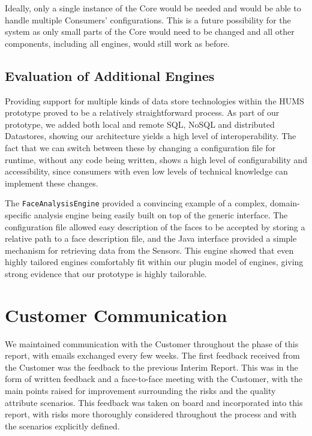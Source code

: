 \documentclass[10pt,a4paper]{article}
\begin{document}
Ideally, only a single instance of the Core would be needed and would be able to handle multiple Consumers' configurations. This is a future possibility for the system as only small parts of the Core would need to be changed and all other components, including all engines, would still work as before.

\subsection{Evaluation of Additional Engines}
\label{sec:additional}

Providing support for multiple kinds of data store technologies within the HUMS prototype proved to be a relatively straightforward process. As part of our prototype, we added both local and remote SQL, NoSQL and distributed Datastores, showing our architecture yields a high level of interoperability. The fact that we can switch between these by changing a configuration file for runtime, without any code being written, shows a high level of configurability and accessibility, since consumers with even low levels of technical knowledge can implement these changes.

The \texttt{FaceAnalysisEngine} provided a convincing example of a complex, domain-specific analysis engine being easily built on top of the generic interface. The configuration file allowed easy description of the faces to be accepted by storing a relative path to a face description file, and the Java interface provided a simple mechanism for retrieving data from the Sensors. This engine showed that even highly tailored engines comfortably fit within our plugin model of engines, giving strong evidence that our prototype is highly tailorable.


\section{Customer Communication}
\label{sec:customer_comms}

We maintained communication with the Customer throughout the phase of this report, with emails exchanged every few weeks. The first feedback received from the Customer was the feedback to the previous Interim Report. This was in the form of written feedback and a face-to-face meeting with the Customer, with the main points raised for improvement surrounding the risks and the quality attribute scenarios. This feedback was taken on board and incorporated into this report, with risks more thoroughly considered throughout the process and with the scenarios explicitly defined.
\end{document}
